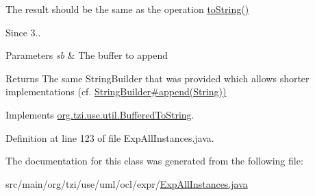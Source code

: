 The result should be the same as the operation \hyperlink{classorg_1_1tzi_1_1use_1_1uml_1_1ocl_1_1expr_1_1_expression_a01192513b1b1adbc44727a67ae14d02e}{to\-String()} 

\begin{DoxySince}{Since}
3.. 
\end{DoxySince}

\begin{DoxyParams}{Parameters}
{\em sb} & The buffer to append \\
\hline
\end{DoxyParams}
\begin{DoxyReturn}{Returns}
The same String\-Builder that was provided which allows shorter implementations (cf. \hyperlink{}{String\-Builder\#append(\-String))} 
\end{DoxyReturn}


Implements \hyperlink{interfaceorg_1_1tzi_1_1use_1_1util_1_1_buffered_to_string_aea95e4e53b18818d50ee253700e6e2d5}{org.\-tzi.\-use.\-util.\-Buffered\-To\-String}.



Definition at line 123 of file Exp\-All\-Instances.\-java.



The documentation for this class was generated from the following file\-:\begin{DoxyCompactItemize}
\item 
src/main/org/tzi/use/uml/ocl/expr/\hyperlink{_exp_all_instances_8java}{Exp\-All\-Instances.\-java}\end{DoxyCompactItemize}
